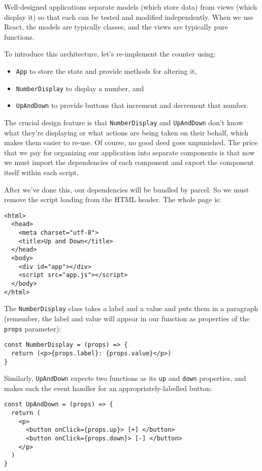 Well-designed applications separate models (which store data)
from views (which display it)
so that each can be tested and modified independently.
When we use React,
the models are typically classes,
and the views are typically pure functions.

To introduce this architecture,
let's re-implement the counter using:

\begin{itemize}
\item
  \texttt{App} to store the state and provide methods for altering it,
\item
  \texttt{NumberDisplay} to display a number, and
\item
  \texttt{UpAndDown} to provide buttons that increment and decrement that number.
\end{itemize}

The crucial design feature is that
\texttt{NumberDisplay} and \texttt{UpAndDown} don't know what they're displaying
or what actions are being taken on their behalf,
which makes them easier to re-use.
Of course,
no good deed goes unpunished.
The price that we pay
for organizing our application into separate components
is that now we must import the dependencies of each component
and export the component itself within each script.

After we've done this,
our dependencies will be bundled by parcel.
So we must remove the script loading from the HTML header.
The whole page is:

\begin{verbatim}
<html>
  <head>
    <meta charset="utf-8">
    <title>Up and Down</title>
  </head>
  <body>
    <div id="app"></div>
    <script src="app.js"></script>
  </body>
</html>
\end{verbatim}

The \texttt{NumberDisplay} class takes a label and a value and puts them in a paragraph
(remember, the label and value will appear in our function as properties of the \texttt{props} parameter):

\begin{verbatim}
const NumberDisplay = (props) => {
  return (<p>{props.label}: {props.value}</p>)
}
\end{verbatim}

Similarly,
\texttt{UpAndDown} expects two functions as its \texttt{up} and \texttt{down} properties,
and makes each the event handler for an appropriately-labelled button:

\begin{verbatim}
const UpAndDown = (props) => {
  return (
    <p>
      <button onClick={props.up}> [+] </button>
      <button onClick={props.down}> [-] </button>
    </p>
  )
}
\end{verbatim}

